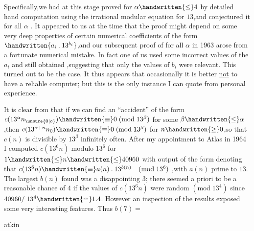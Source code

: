 \noindent Specifically,we had at this stage proved  for $\alpha\handwritten{\leq}4$ by detailed hand computation using the irrational modular equation for $13$,and conjectured it for all $\alpha$ . It appeared to us at the time that the proof might depend on some very deep properties of certain numerical coefficients of the form $\handwritten{a_{i}\mathbin{.}13^{b_{i}}}$,and our subsequent proof of  for all $\alpha$ in 1963 arose from a fortunate numerical mistake. In fact one of us used \unsure{\textquotesingle}some incorrect values of the \uline{$a_{i}$} and still obtained ,suggesting that only the values of \uline{$b_{i}$} were relevant. This turned out to be the case. It thus appears that occasionally it is better \uline{not} to have a reliable computer; but this is the only instance I can quote from personal experience.

It is clear from  that if we can find an ``accident'' of the form $c(13^{\alpha}n_{\unsure{0|o}})\handwritten{\equiv}0\;(\mathrm{mod}\;13^{\beta})$ for some $\beta\handwritten{\leq}\alpha$,then $c(13^{\alpha+n}n_{0})\handwritten{\equiv}0\;(\mathrm{mod}\;13^{\beta})$ for $n\handwritten{\geq}0$,so that \uline{$c(n)$} is divisible by $13^{\beta}$ infinitely often. After my appointment to Atlas in 1964 I computed \uline{$c(13^{6}n)$} modulo $13^{6}$ for $1\handwritten{\leq}n\handwritten{\leq}40960$ with output of the form
denoting that $c(13^{6}n)\handwritten{\equiv}a(n)\mathbin{.}13^{b(n)}\quad(\mathrm{mod}\;13^{6})$ ,with \uline{$a(n)$} prime to $13$. The largest $b(n)$ found was a disappointing $3$; there seemed a priori to be a reasonable chance of $4$ if the values of \uline{$c(13^{6}n)$} were random $(\mathrm{mod}\;13^{4})$ since $40960/\;13^{4}\handwritten{\bumpeq}1.4$. However an inspection of the results exposed some very interesting features. Thus $b(7)=$\ \parbox[c]{12mm}{}


\noindent\hfill atkin  

